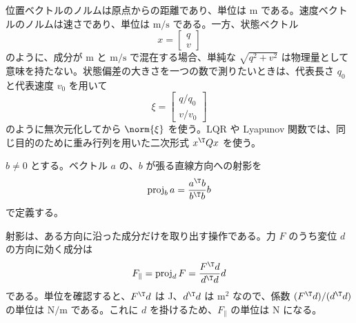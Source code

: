 位置ベクトルのノルムは原点からの距離であり、単位は m である。速度ベクトルのノルムは速さであり、単位は $\mathrm{m/s}$ である。一方、状態ベクトル
\begin{equation}
  x=\begin{bmatrix}q\\v\end{bmatrix}
\end{equation}
のように、成分が m と $\mathrm{m/s}$ で混在する場合、単純な $\sqrt{q^2+v^2}$ は物理量として意味を持たない。状態偏差の大きさを一つの数で測りたいときは、代表長さ $q_0$ と代表速度 $v_0$ を用いて
\begin{equation}
  \xi=
  \begin{bmatrix}
    q/q_0\\
    v/v_0
  \end{bmatrix}
\end{equation}
のように無次元化してから $\norm{\xi}$ を使う。LQR や Lyapunov 関数では、同じ目的のために重み行列を用いた二次形式 $x^\T Qx$ を使う。

\begin{definition}[射影]
$b\ne0$ とする。ベクトル $a$ の、$b$ が張る直線方向への射影を
\begin{equation}
  \operatorname{proj}_{b}a
  =
  \frac{a^\T b}{b^\T b}b
\end{equation}
で定義する。
\end{definition}

射影は、ある方向に沿った成分だけを取り出す操作である。力 $F$ のうち変位 $d$ の方向に効く成分は
\begin{equation}
  F_{\parallel}
  =
  \operatorname{proj}_{d}F
  =
  \frac{F^\T d}{d^\T d}d
\end{equation}
である。単位を確認すると、$F^\T d$ は J、$d^\T d$ は $\mathrm{m^2}$ なので、係数 $(F^\T d)/(d^\T d)$ の単位は $\mathrm{N/m}$ である。これに $d$ を掛けるため、$F_{\parallel}$ の単位は N になる。

